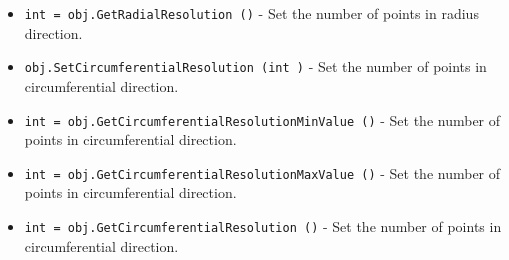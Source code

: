 \begin{itemize}
\item  \verb|int = obj.GetRadialResolution ()| -  Set the number of points in radius direction.

\item  \verb|obj.SetCircumferentialResolution (int )| -  Set the number of points in circumferential direction.

\item  \verb|int = obj.GetCircumferentialResolutionMinValue ()| -  Set the number of points in circumferential direction.

\item  \verb|int = obj.GetCircumferentialResolutionMaxValue ()| -  Set the number of points in circumferential direction.

\item  \verb|int = obj.GetCircumferentialResolution ()| -  Set the number of points in circumferential direction.

\end{itemize}

